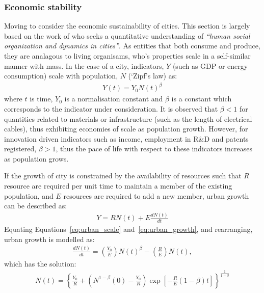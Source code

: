 \subsubsection{Economic stability}
Moving to consider the economic sustainability of cities. This section is largely based on the work of \citet{Bettencourt2007} who seeks a quantitative understanding of \emph{``human social organization and dynamics in cities''}. As entities that both consume and produce, they are analagous to living organisams, who's properties scale in a self-similar manner with mass. In the case of a city, indicators, $Y$ (such as GDP or energy consumption) scale with population, $N$ (`Zipf's law) as:
\begin{align} \label{eq:urban_scale}
	Y(t)=Y_0N(t)^{\beta}
\end{align}
where $t$ is time, $Y_0$ is a normalisation constant and $\beta$ is a constant which corresponds to the indicator under consideration. It is observed that $\beta<1$ for quantities related to materials or infrastructure (such as the length of electrical cables), thus exhibiting economies of scale as population growth. However, for innovation driven indicators such as income, employment in R\&D and patents registered, $\beta>1$, thus the pace of life with respect to these indicators increases as population grows. %

If the growth of city is constrained by the availability of resources such that $R$ resource are required per unit time to maintain a member of the existing population, and $E$ resources are required to add a new member, urban growth can be described as:
\begin{align} \label{eq:urban_growth}
	Y=RN(t)+E\frac{dN(t)}{dt}
\end{align}
Equating Equations~\eqref{eq:urban_scale} and~\eqref{eq:urban_growth}, and rearranging, urban growth is modelled as:
\begin{align}
	\frac{dN(t)}{dt}=\left(\frac{Y_0}{E}\right)N(t)^{\beta}-\left(\frac{R}{E}\right)N(t),
\end{align}
which has the solution:
\begin{align}
	N(t)=\left\{\frac{Y_0}{R}+\left(N^{1-\beta}(0)-\frac{Y_0}{R}\right)\exp\left[-\frac{R}{E}(1-\beta)t\right]\right\}^{\frac{1}{1-\beta}}
\end{align}

